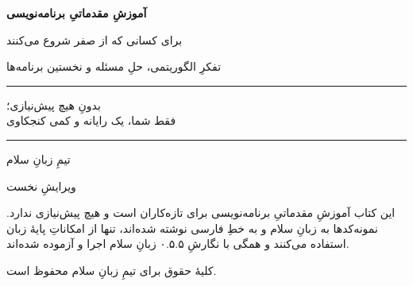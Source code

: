 \documentclass[12pt,a4paper,openany]{book}
\makeatletter
\newcommand{\beginappendices}{\clearpage
  \setcounter{chapter}{0}\setcounter{section}{0}%
  \gdef\@chapapp{\appendixname}%
  \renewcommand{\thechapter}{\Alph{chapter}}%
  \renewcommand{\theHchapter}{app.\arabic{chapter}}%
  \renewcommand{\theHsection}{app.\arabic{chapter}.\arabic{section}}}
\makeatother
\begin{document}
\begin{titlepage}
\centering
\vspace*{2cm}
{\Huge\bfseries آموزشِ مقدماتیِ برنامه‌نویسی\par}
\vspace{0.6cm}
{\LARGE برای کسانی که از صفر شروع می‌کنند\par}
\vspace{1.2cm}
{\large تفکرِ الگوریتمی، حلِ مسئله و نخستین برنامه‌ها\par}
\vspace{2.5cm}
\rule{0.7\textwidth}{0.6pt}\par
\vspace{0.8cm}
{\large بدونِ هیچ پیش‌نیازی؛\\[4pt]
فقط شما، یک رایانه و کمی کنجکاوی\par}
\vspace{0.8cm}
\rule{0.7\textwidth}{0.6pt}\par
\vfill
{\large تیمِ زبانِ سلام\par}
\vspace{0.4cm}
{\normalsize ویرایشِ نخست\par}
\end{titlepage}

\thispagestyle{empty}
\noindent\small
این کتاب آموزشِ مقدماتیِ برنامه‌نویسی برای تازه‌کاران است و هیچ پیش‌نیازی
ندارد. نمونه‌کدها به زبانِ سلام و به خطِ فارسی نوشته شده‌اند، تنها از
امکاناتِ پایهٔ زبان استفاده می‌کنند و همگی با نگارشِ ۰.۵.۵ زبانِ سلام اجرا و
آزموده شده‌اند.\par
\vspace{0.3cm}
\noindent کلیهٔ حقوق برای تیمِ زبانِ سلام محفوظ است.\par
\normalsize
\clearpage



\tableofcontents
\clearpage

\mainmatter












\beginappendices

\end{document}
